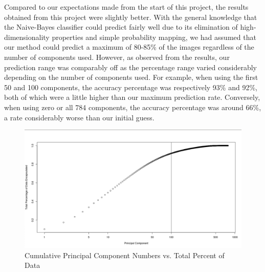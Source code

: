 \documentclass[twocolumn]{article}
\begin{document}
Compared to our expectations made from the start of this project, the results obtained from this project were slightly better. With the general knowledge that the Naive-Bayes classifier could predict fairly well due to its elimination of high-dimensionality properties and simple probability mapping, we had assumed that our method could predict a maximum of 80-85\% of the images regardless of the number of components used. However, as observed from the results, our prediction range was comparably off as the percentage range varied considerably depending on the number of components used. For example, when using the first 50 and 100 components, the accuracy percentage was respectively 93\% and 92\%, both of which were a little higher than our maximum prediction rate. Conversely, when using zero or all 784 components, the accuracy percentage was around 66\%, a rate considerably worse than our initial guess.

\begin{figure}
    \centering
    \includegraphics[scale=0.35]{CmptPctPlot.png}
    \caption{Cumulative Principal Component Numbers vs. Total Percent of Data}
\end{figure}
\end{document}
